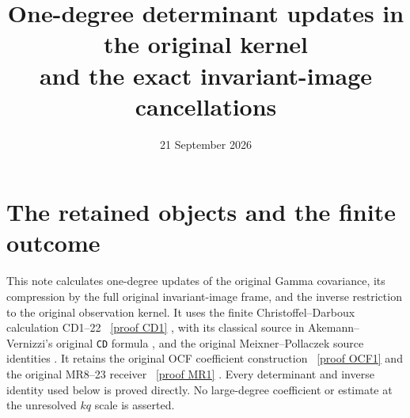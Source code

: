 \documentclass[11pt]{article}
\title{One-degree determinant updates in the original kernel\\and the exact invariant-image cancellations}
\author{}
\date{21 September 2026}
\begin{document}
\maketitle

\section{The retained objects and the finite outcome}

This note calculates one-degree updates of the original Gamma covariance,
its compression by the full original invariant-image frame, and the
inverse restriction to the original observation kernel. It uses the
finite Christoffel--Darboux calculation CD1--22 \cite{CD}%
~\href{https://github.com/KokunoYumeto/zeta-function-research-reader/blob/main/workbenches/splitzero-tandem/continuations/20260921-kernel-degree-steps/COMPLETE_CD_BOUNDARY.tex\#L42}{[proof CD1]}%
{}, with its
classical source in Akemann--Vernizzi's original \texttt{CD} formula
\cite{AV}, and the original Meixner--Pollaczek source identities
\cite{DLMF}. It retains the original OCF coefficient construction
\cite{OCF}%
~\href{https://github.com/KokunoYumeto/zeta-function-research-reader/blob/5992ad50c0f2a06921f1fcaded7b4e38097c0739/workbenches/splitzero-tandem/continuations/20260920-original-kernel-mixed-determinants/providers/ORIGINAL_CONDUCTOR_STRIP_FRAME.tex\#L27}{[proof OCF1]}%
{} and the original MR8--23 receiver \cite{MR}%
~\href{https://github.com/KokunoYumeto/zeta-function-research-reader/blob/5992ad50c0f2a06921f1fcaded7b4e38097c0739/workbenches/splitzero-tandem/continuations/20260920-original-kernel-mixed-determinants/ORIGINAL_KERNEL_MIXED_DETERMINANT.tex\#L36}{[proof MR1]}%
{}.
Every determinant and inverse identity used below is proved directly.
No large-degree coefficient or estimate at the unresolved \(kq\) scale
is asserted.
\end{document}
